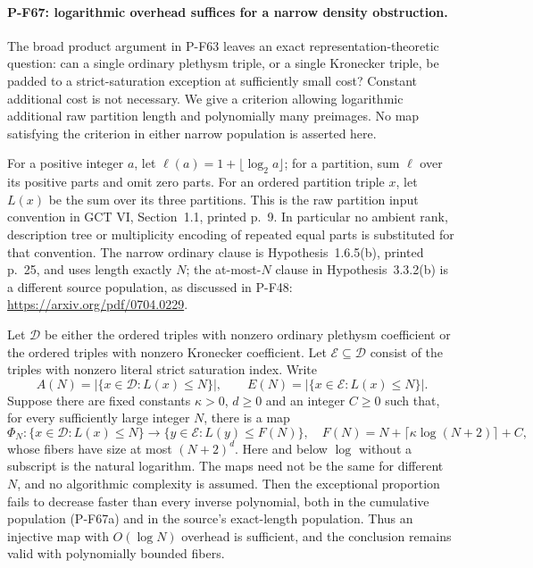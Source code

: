 \paragraph{P-F67: logarithmic overhead suffices for a narrow density obstruction.}
The broad product argument in P-F63 leaves an exact representation-theoretic
question: can a single ordinary plethysm triple, or a single Kronecker
triple, be padded to a strict-saturation exception at sufficiently small
cost?  Constant additional cost is not necessary.  We give a criterion
allowing logarithmic additional raw partition length and polynomially
many preimages.  No map satisfying the criterion in either narrow
population is asserted here.

For a positive integer $a$, let $\ell(a)=1+\lfloor\log_2a\rfloor$;
for a partition, sum $\ell$ over its positive parts and omit zero parts.
For an ordered partition triple $x$, let $L(x)$ be the sum over its
three partitions.  This is the raw partition input convention in
GCT VI, Section~1.1, printed p.~9.  In particular no ambient rank,
description tree or multiplicity encoding of repeated equal parts is
substituted for that convention.  The narrow ordinary clause is
Hypothesis~1.6.5(b), printed p.~25, and uses length exactly $N$;
the at-most-$N$ clause in Hypothesis~3.3.2(b) is a different source
population, as discussed in P-F48:
\url{https://arxiv.org/pdf/0704.0229}.

Let $\mathcal D$ be either the ordered triples with nonzero ordinary
plethysm coefficient or the ordered triples with nonzero Kronecker
coefficient.  Let $\mathcal E\subseteq\mathcal D$ consist of the
triples with nonzero literal strict saturation index.  Write
\[
 A(N)=|\{x\in\mathcal D:L(x)\le N\}|,\qquad
 E(N)=|\{x\in\mathcal E:L(x)\le N\}|.
 \tag{P-F67a}
\]
Suppose there are fixed constants $\kappa>0$, $d\ge0$ and an integer
$C\ge0$ such that, for every sufficiently large integer $N$, there
is a map
\[
 \Phi_N:\{x\in\mathcal D:L(x)\le N\}
       \longrightarrow
       \{y\in\mathcal E:L(y)\le F(N)\},
 \quad F(N)=N+\lceil\kappa\log(N+2)\rceil+C,
 \tag{P-F67b}
\]
whose fibers have size at most $(N+2)^d$.  Here and below $\log$
without a subscript is the natural logarithm.  The maps need not be
the same for different $N$, and no algorithmic complexity is assumed.
Then the exceptional proportion fails to decrease faster than every
inverse polynomial, both in the cumulative population (P-F67a) and
in the source's exact-length population.  Thus an injective map with
$O(\log N)$ overhead is sufficient, and the conclusion remains valid
with polynomially bounded fibers.


